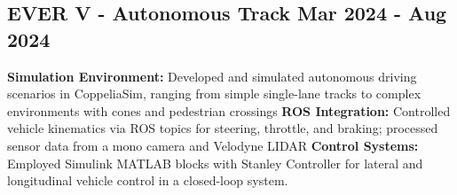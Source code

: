 \subsection*{
  EVER V - Autonomous Track
  \hspace*{\fill}
  \dateformat Mar 2024 - Aug 2024
}
\begin{tasks}
  \task \textbf{Simulation Environment:} Developed and simulated autonomous driving scenarios in CoppeliaSim, ranging from simple single-lane tracks to complex environments with cones and pedestrian crossings
  \task \textbf{ROS Integration:} Controlled vehicle kinematics via ROS topics for steering, throttle, and braking; processed sensor data from a mono camera and Velodyne LIDAR
  \task \textbf{Control Systems:} Employed Simulink MATLAB blocks with Stanley Controller for lateral and longitudinal vehicle control in a closed-loop system.
\end{tasks}
%
%
%
%
%
%
%
%
%
%
